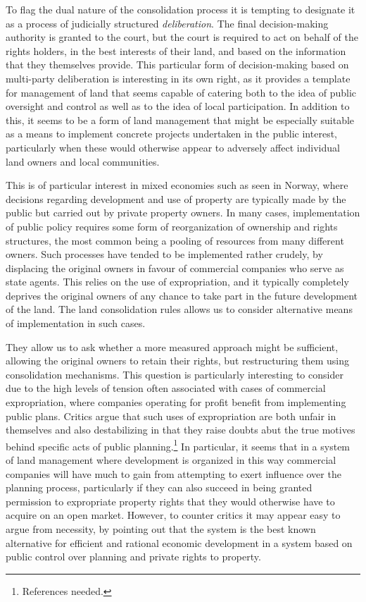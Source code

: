 To flag the dual nature of the consolidation process it is tempting to designate it as a process of judicially structured \emph{deliberation}. The final decision-making authority is granted to the court, but the court is required to act on behalf of the rights holders, in the best interests of their land, and based on the information that they themselves provide. This particular form of decision-making based on multi-party deliberation is interesting in its own right, as it provides a template for management of land that seems capable of catering both to the idea of public oversight and control as well as to the idea of local participation. In addition to this, it seems to be a form of land management that might be especially suitable as a means to implement concrete projects undertaken in the public interest, particularly when these would otherwise appear to adversely affect individual land owners and local communities.

This is of particular interest in mixed economies such as seen in Norway, where decisions regarding development and use of property are typically made by the public but carried out by private property owners. In many cases, implementation of public policy requires some form of reorganization of ownership and rights structures, the most common being a pooling of resources from many different owners. Such processes have tended to be implemented rather crudely, by displacing the original owners in favour of commercial companies who serve as state agents. This relies on the use of expropriation, and it typically completely deprives the original owners of any chance to take part in the future development of the land. The land consolidation rules allows us to consider alternative means of implementation in such cases. 

They allow us to ask whether a more measured approach might be sufficient, allowing the original owners to retain their rights, but restructuring them using consolidation mechanisms. This question is particularly interesting to consider due to the high levels of tension often associated with cases of commercial expropriation, where companies operating for profit benefit from implementing public plans. Critics argue that such uses of expropriation are both unfair in themselves and also destabilizing in that they raise doubts abut the true motives behind specific acts of public planning.\footnote{References needed.} In particular, it seems that in a system of land management where development is organized in this way commercial companies will have much to gain from attempting to exert influence over the planning process, particularly if they can also succeed in being granted permission to expropriate property rights that they would otherwise have to acquire on an open market. However, to counter critics it may appear easy to argue from necessity, by pointing out that the system is the best known alternative for efficient and rational economic development in a system based on public control over planning and private rights to property.

